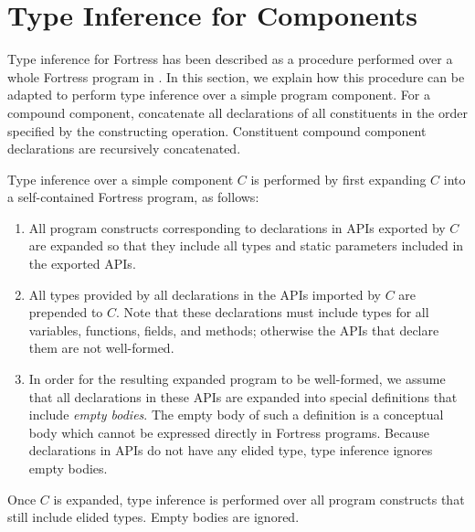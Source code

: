 %
%
%
%

\section{Type Inference for Components}

Type inference for Fortress has been described as a procedure performed
over a whole Fortress program in . In this
section, we explain how this procedure can 
be adapted to perform type inference over a simple program component. 
For a compound component,
concatenate all declarations of all constituents in
the order specified by the constructing 
operation.  Constituent compound component declarations are
recursively concatenated.


Type inference over a simple component $C$ is performed by first
expanding $C$ into a self-contained Fortress program, as follows:
\begin{enumerate}
\item All program constructs corresponding to declarations in APIs exported by
$C$ are expanded so that they include all types and static parameters
included in the exported APIs. 
\item All types provided by all declarations in the APIs imported by $C$
are prepended to $C$. Note that these declarations must include
types for all variables, functions, fields, and methods;
otherwise the APIs that declare them are not well-formed.
\item In order for the resulting expanded program to be well-formed, 
we assume that all declarations in these APIs are
expanded into special definitions that include \emph{empty bodies}.
The empty body of such a definition is a conceptual body which
cannot be expressed directly in Fortress programs.
Because declarations in APIs do not have any elided type,
type inference ignores empty bodies.
\end{enumerate}
Once $C$ is expanded, type inference 
is performed over all program constructs that still include elided types.
Empty bodies are ignored.
